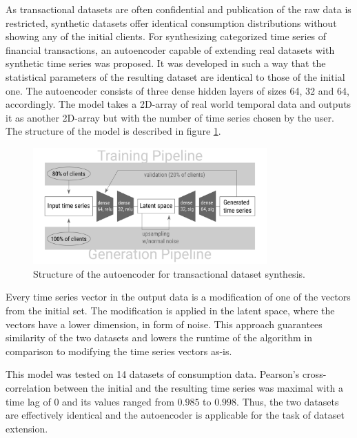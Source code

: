 \documentclass[13pt, a4paper]{article}
\begin{document}
As transactional datasets are often confidential and publication of the raw data is restricted, synthetic datasets offer identical consumption distributions without showing any of the initial clients. For synthesizing categorized time series of financial transactions, an autoencoder capable of extending real datasets with synthetic time series was proposed. It was developed in such a way that the statistical parameters of the resulting dataset are identical to those of the initial one. The autoencoder consists of three dense hidden layers of sizes 64, 32 and 64, accordingly. The model takes a 2D-array of real world temporal data and outputs it as another 2D-array but with the number of time series chosen by the user. The structure of the model is described in figure \ref{fig:gr7}.
\begin{figure}[h!]\vspace*{4pt}
	\centerline{\includegraphics[width=0.8\textwidth]{./visuals/gr7.png}}
\caption{Structure of the autoencoder for transactional dataset synthesis.}
\label{fig:gr7}
\end{figure}

Every time series vector in the output data is a modification of one of the vectors from the initial set. The modification is applied in the latent space, where the vectors have a lower dimension, in form of noise. This approach guarantees similarity of the two datasets and lowers the runtime of the algorithm in comparison to modifying the time series vectors as-is.

This model was tested on 14 datasets of consumption data. Pearson's cross-correlation between the initial and the resulting time series was maximal with a time lag of 0 and its values ranged from $0.985$ to $0.998$. Thus, the two datasets are effectively identical and the autoencoder is applicable for the task of dataset extension.
\end{document}
